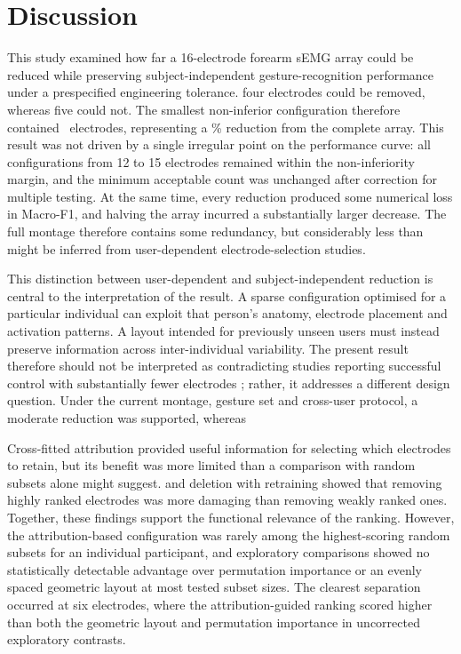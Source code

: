 \section{Discussion}
\label{sec:discussion}

This study examined how far a 16-electrode forearm sEMG array could be reduced while preserving subject-independent gesture-recognition performance under a prespecified engineering tolerance.  four electrodes could be removed, whereas five could not. The smallest non-inferior configuration therefore contained \KStar\ electrodes, representing a \KStarReductionPct\% reduction from the complete array. This result was not driven by a single irregular point on the performance curve: all configurations from 12 to 15 electrodes remained within the non-inferiority margin, and the minimum acceptable count was unchanged after correction for multiple testing. At the same time, every reduction produced some numerical loss in Macro-F1, and halving the array incurred a substantially larger decrease. The full montage therefore contains some redundancy, but considerably less than might be inferred from user-dependent electrode-selection studies.

This distinction between user-dependent and subject-independent reduction is central to the interpretation of the result. A sparse configuration optimised for a particular individual can exploit that person's anatomy, electrode placement and activation patterns. A layout intended for previously unseen users must instead preserve information across inter-individual variability. The present result therefore should not be interpreted as contradicting studies reporting successful control with substantially fewer electrodes \citep{phinyomark2018emg,qu2021reduce}; rather, it addresses a different design question. Under the current montage, gesture set and cross-user protocol, a moderate reduction was supported, whereas 

Cross-fitted attribution provided useful information for selecting which electrodes to retain, but its benefit was more limited than a comparison with random subsets alone might suggest.  and deletion with retraining showed that removing highly ranked electrodes was more damaging than removing weakly ranked ones. Together, these findings support the functional relevance of the ranking. However, the attribution-based configuration was rarely among the highest-scoring random subsets for an individual participant, and exploratory comparisons showed no statistically detectable advantage over permutation importance or an evenly spaced geometric layout at most tested subset sizes. The clearest separation occurred at six electrodes, where the attribution-guided ranking scored higher than both the geometric layout and permutation importance in uncorrected exploratory contrasts.

